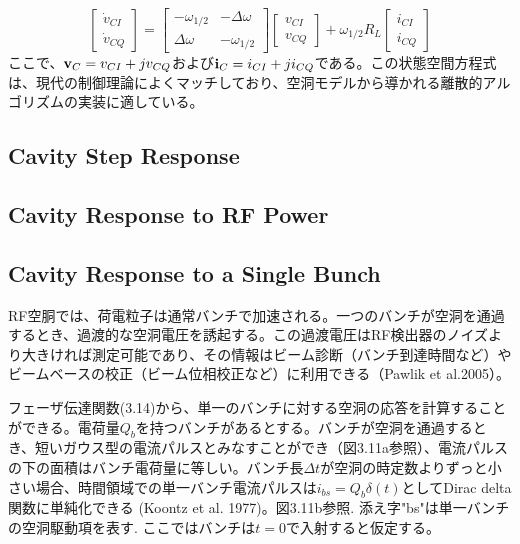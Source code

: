 \documentclass[book]{jlreq}
\begin{document}
\begin{equation}
    \begin{bmatrix}
        \dot{v}_{CI}\\
        \dot{v}_{CQ}
    \end{bmatrix}
    =
    \begin{bmatrix}
        -\omega_{1/2} & -\Delta\omega \\
        \Delta\omega & -\omega_{1/2}
    \end{bmatrix}
    \begin{bmatrix}
        v_{CI} \\
        v_{CQ}
    \end{bmatrix}
    +\omega_{1/2}R_L
    \begin{bmatrix}
        i_{CI} \\
        i_{CQ}
    \end{bmatrix}
    \label{eq:3.16}
\end{equation}
%
ここで、$\vb{v}_C = v_{CI} + j v_{CQ}$および$\vb{i}_C = i_{CI} + j i_{CQ}$である。この状態空間方程式は、現代の制御理論によくマッチしており、空洞モデルから導かれる離散的アルゴリズムの実装に適している。

\subsection{Cavity Step Response}

\subsection{Cavity Response to RF Power}

\subsection{Cavity Response to a Single Bunch}

RF空胴では、荷電粒子は通常バンチで加速される。一つのバンチが空洞を通過するとき、過渡的な空洞電圧を誘起する。この過渡電圧はRF検出器のノイズより大きければ測定可能であり、その情報はビーム診断（バンチ到達時間など）やビームベースの校正（ビーム位相校正など）に利用できる（Pawlik et al.2005）。

フェーザ伝達関数(3.14)から、単一のバンチに対する空洞の応答を計算することができる。電荷量$Q_b$を持つバンチがあるとする。バンチが空洞を通過するとき、短いガウス型の電流パルスとみなすことができ（図3.11a参照）、電流パルスの下の面積はバンチ電荷量に等しい。バンチ長$\Delta t$が空洞の時定数よりずっと小さい場合、時間領域での単一バンチ電流パルスは$i_{bs} = Q_b\delta(t)$としてDirac delta関数に単純化できる (Koontz et al. 1977)。図3.11b参照. 添え字"bs"は単一バンチの空洞駆動項を表す. ここではバンチは$t = 0$で入射すると仮定する。
\end{document}
